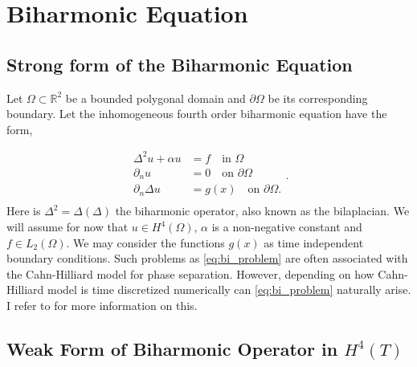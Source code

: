 \newpage
\section{ Biharmonic Equation}
\label{sec:ch1}


\subsection{Strong form of the Biharmonic Equation}%
\label{sub:strong_form_of_the_biharmonic_equation}

Let $\Omega \subset   \mathbb{R} ^2$ be a bounded polygonal domain and $\partial \Omega $ be its corresponding boundary. Let the inhomogeneous fourth order biharmonic equation have the form,

\begin{equation}
\label{eq:bi_problem}
\begin{split}
    \Delta^2  u  + \alpha  u  & = f \quad \text{in } \Omega   \\
    \partial _{n} u & = 0  \quad \text{on } \partial \Omega  \\
    \partial _{n} \Delta  u & = g\left( x \right)  \quad \text{on } \partial \Omega .  \\
\end{split}
.\end{equation}
Here is $\Delta ^2 = \Delta  \left( \Delta  \right) $ the biharmonic operator, also known as the bilaplacian. We will assume for now that $u \in H^{4}\left( \Omega  \right) $, $\alpha $ is a non-negative constant and $f \in L_{2}\left( \Omega  \right)
$. We may consider the functions $g\left( x \right) $ as time independent boundary conditions. Such problems as \eqref{eq:bi_problem} are often associated with the Cahn-Hilliard model
\cite{cahnhilliard1957} for phase separation. However, depending on how Cahn-Hilliard model is time discretized numerically can
\eqref{eq:bi_problem} naturally arise. I refer to \cite{brenner2012quadratic} for more information on this.

\subsection{ Weak Form of Biharmonic Operator in $H^{4} \left( T  \right)$}%
\label{sub:weak_form_biharmonic_identity_for_triangles}


